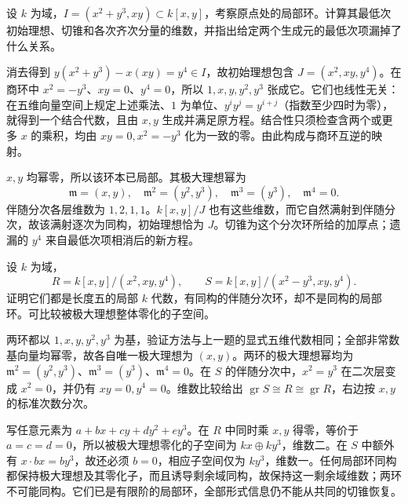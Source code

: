 \begin{exercise}\label{g5:ex:initial-ideal-extra-relation}
	设 \(k\) 为域，\(I=(x^2+y^3,xy)\subset k[x,y]\)，考察原点处的局部环。计算其最低次初始理想、切锥和各次齐次分量的维数，并指出给定两个生成元的最低次项漏掉了什么关系。
\end{exercise}
\begin{solution}
	消去得到 \(y(x^2+y^3)-x(xy)=y^4\in I\)，故初始理想包含
	\(J=(x^2,xy,y^4)\)。在商环中 \(x^2=-y^3\)、\(xy=0\)、\(y^4=0\)，所以 \(1,x,y,y^2,y^3\) 张成它。它们也线性无关：在五维向量空间上规定上述乘法、\(1\) 为单位、\(y^iy^j=y^{i+j}\)（指数至少四时为零），就得到一个结合代数，且由 \(x,y\) 生成并满足原方程。结合性只须检查含两个或更多 \(x\) 的乘积，均由 \(xy=0,x^2=-y^3\) 化为一致的零。由此构成与商环互逆的映射。

	\(x,y\) 均幂零，所以该环本已局部。其极大理想幂为
	\[
		\mathfrak m=(x,y),\quad
		\mathfrak m^2=(y^2,y^3),\quad
		\mathfrak m^3=(y^3),\quad
		\mathfrak m^4=0.
	\]
	伴随分次各层维数为 \(1,2,1,1\)。\(k[x,y]/J\) 也有这些维数，而它自然满射到伴随分次，故该满射逐次为同构，初始理想恰为 \(J\)。切锥为这个分次环所给的加厚点；遗漏的 \(y^4\) 来自最低次项相消后的新方程。
\end{solution}

\begin{exercise}\label{g5:ex:same-cone-different-local-rings}
	设 \(k\) 为域，
	\[
		R=k[x,y]/(x^2,xy,y^4),\qquad
		S=k[x,y]/(x^2-y^3,xy,y^4).
	\]
	证明它们都是长度五的局部 \(k\) 代数，有同构的伴随分次环，却不是同构的局部环。可比较被极大理想整体零化的子空间。
\end{exercise}
\begin{solution}
	两环都以 \(1,x,y,y^2,y^3\) 为基，验证方法与上一题的显式五维代数相同；全部非常数基向量均幂零，故各自唯一极大理想为 \((x,y)\)。两环的极大理想幂均为
	\(\mathfrak m^2=(y^2,y^3)\)、\(\mathfrak m^3=(y^3)\)、\(\mathfrak m^4=0\)。在 \(S\) 的伴随分次中，\(x^2=y^3\) 在二次层变成 \(x^2=0\)，并仍有 \(xy=0,y^4=0\)。维数比较给出
	\(\operatorname{gr}S\cong R\cong\operatorname{gr}R\)，右边按 \(x,y\) 的标准次数分次。

	写任意元素为 \(a+bx+cy+dy^2+ey^3\)。在 \(R\) 中同时乘 \(x,y\) 得零，等价于 \(a=c=d=0\)，所以被极大理想零化的子空间为 \(kx\oplus ky^3\)，维数二。在 \(S\) 中额外有 \(x\cdot bx=by^3\)，故还必须 \(b=0\)，相应子空间仅为 \(ky^3\)，维数一。任何局部环同构都保持极大理想及其零化子，而且诱导剩余域同构，故保持这一剩余域维数；两环不可能同构。它们已是有限阶的局部环，全部形式信息仍不能从共同的切锥恢复。
\end{solution}

